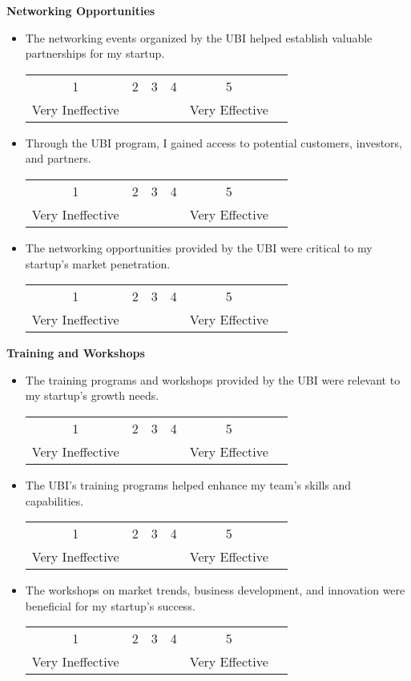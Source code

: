 \documentclass[../Main.tex]{subfiles}%
\begin{document}
	\textbf{Networking Opportunities}
	\begin{itemize}
		\item The networking events organized by the UBI helped establish valuable partnerships for my startup.
		\begin{center}
		\begin{tabular}{cccccc}
		1 & 2 & 3 & 4 & 5 \\
		Very Ineffective & & & & Very Effective
		\end{tabular}
		\end{center}
		\item Through the UBI program, I gained access to potential customers, investors, and partners.
		\begin{center}
		\begin{tabular}{cccccc}
		1 & 2 & 3 & 4 & 5 \\
		Very Ineffective & & & & Very Effective
		\end{tabular}
		\end{center}
		\item The networking opportunities provided by the UBI were critical to my startup's market penetration.
		\begin{center}
		\begin{tabular}{cccccc}
		1 & 2 & 3 & 4 & 5 \\
		Very Ineffective & & & & Very Effective
		\end{tabular}
		\end{center}
	\end{itemize}
	
	\textbf{Training and Workshops}
	\begin{itemize}
		\item The training programs and workshops provided by the UBI were relevant to my startup's growth needs.
		\begin{center}
		\begin{tabular}{cccccc}
		1 & 2 & 3 & 4 & 5 \\
		Very Ineffective & & & & Very Effective
		\end{tabular}
		\end{center}
		\item The UBI's training programs helped enhance my team's skills and capabilities.
		\begin{center}
		\begin{tabular}{cccccc}
		1 & 2 & 3 & 4 & 5 \\
		Very Ineffective & & & & Very Effective
		\end{tabular}
		\end{center}
		\item The workshops on market trends, business development, and innovation were beneficial for my startup's success.
		\begin{center}
		\begin{tabular}{cccccc}
		1 & 2 & 3 & 4 & 5 \\
		Very Ineffective & & & & Very Effective
		\end{tabular}
		\end{center}
	\end{itemize}
	
\end{document}
